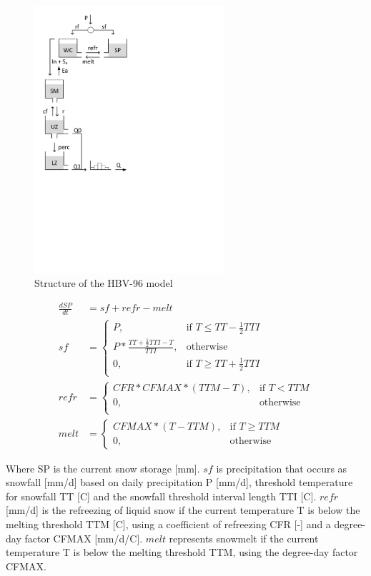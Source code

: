{ 																	%
\begin{figure}
\includegraphics[trim=1cm 11.1cm 7cm 1cm,width=7cm,keepaspectratio]{./files/37_schematic.pdf}
\caption{Structure of the HBV-96 model} \label{fig:37_schematic}
\end{figure}

\begin{align}
	\frac{dSP}{dt} &= sf+refr-melt \\
	sf &= \begin{cases}
		P, &\text{if } T \leq TT-\frac{1}{2}TTI \\
		P*\frac{ TT+\frac{1}{2}TTI-T}{TTI}, &\text{otherwise}\\
		0, &\text{if } T \geq TT+\frac{1}{2}TTI \\
	\end{cases} \\
	refr &= 
	\begin{cases}
		CFR*CFMAX*(TTM-T), & \text{if } T < TTM \\
		0, & \text{otherwise}\\
	\end{cases}\\
	melt &= \begin{cases}
		CFMAX*(T-TTM), &\text{if } T \geq TTM\\
		0, &\text{otherwise}
	\end{cases}
\end{align}

Where SP is the current snow storage [mm]. $sf$ is precipitation that occurs as snowfall [mm/d] based on daily precipitation P [mm/d], threshold temperature for snowfall TT [\degree C] and the snowfall threshold interval length TTI [\degree C]. $refr$ [mm/d] is the refreezing of liquid snow if the current temperature T is below the melting threshold TTM [\degree C], using a coefficient of refreezing CFR [-] and a degree-day factor CFMAX [mm/d/\degree C]. $melt$ represents snowmelt if the current temperature T is below the melting threshold TTM, using the degree-day factor CFMAX. 

} %

